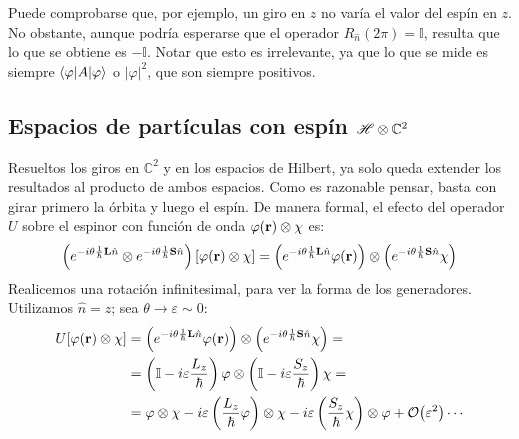 Puede comprobarse que, por ejemplo, un giro en $z$ no varía el valor
del espín en $z$. No obstante, aunque podría esperarse que el operador
$R_{\hat{n}}(2\pi) = \mathbb{I}$, resulta que lo que se obtiene es
$-\mathbb{I}$. Notar que esto es irrelevante, ya que lo que se mide es
siempre $\bra{\varphi|A}\ket{\varphi}$ o $|\varphi|^2$, que son siempre positivos.

\subsection{Espacios de partículas con espín $ \mathscr{H} \otimes \mathbb{C}^2$}
Resueltos los giros en $\mathbb{C}^2$ y en los espacios de Hilbert, ya
solo queda extender los resultados al producto de ambos espacios. Como
es razonable pensar, basta con girar primero la órbita y luego el
espín. De manera formal, el efecto del operador $U$ sobre el espinor
con función de onda $\varphi(\bm{\mathrm{r}})\otimes \chi$ es:
\begin{equation}
  \left( e^{-i\theta \frac{1}{\hbar}\bm{\mathrm{L}}\hat{n}} \otimes
    e^{-i\theta \frac{1}{\hbar}\bm{\mathrm{S}}\hat{n}}\right)
  [\varphi(\bm{\mathrm{r}})\otimes \chi] = \left( e^{-i\theta
      \frac{1}{\hbar}\bm{\mathrm{L}}\hat{n}}\varphi(\bm{\mathrm{r}}) \right)
  \otimes \left( e^{-i\theta \frac{1}{\hbar}\bm{\mathrm{S}}\hat{n}}\chi \right)
\end{equation}
Realicemos una rotación infinitesimal, para ver la forma de los
generadores. Utilizamos $\hat{n}=z$; sea $\theta \to \varepsilon\sim 0$:
\begin{equation}
  \begin{split}
  U [\varphi(\boldrm{r})\otimes \chi] &= \left( e^{-i\theta
      \frac{1}{\hbar}\boldrm{L}\hat{n}}\varphi(\boldrm{r}) \right)
  \otimes \left( e^{-i\theta \frac{1}{\hbar}\boldrm{S}\hat{n}}\chi
  \right)= \\
  &= \left( \mathbb{I}-i\varepsilon \frac{L_z}{\hbar} \right)\varphi \otimes
  \left( \mathbb{I}-i\varepsilon \frac{S_z}{\hbar} \right) \chi = \\
  &= \varphi\otimes \chi - i\varepsilon \left( \frac{L_z}{\hbar}\varphi \right)\otimes \chi  - i \varepsilon
  \left( \frac{S_z}{\hbar}\chi \right)\otimes \varphi  +
  \order{\varepsilon^2} \cdots
  \end{split}
\end{equation}

